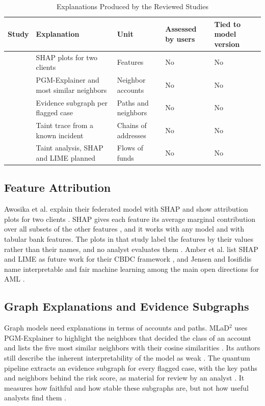 \documentclass[journal]{IEEEtran}
\begin{document}
\begin{table}[!t]
\centering
\caption{Explanations Produced by the Reviewed Studies}
\label{tab:xai}
\footnotesize
\begin{tabular}{@{}L{1.25cm}L{2.0cm}L{1.75cm}L{1.05cm}L{1.0cm}@{}}
\toprule
\textbf{Study} & \textbf{Explanation} & \textbf{Unit} & \textbf{Assessed by users} & \textbf{Tied to model version}\\
\midrule
\cite{awosika2024xai} & SHAP plots for two clients & Features & No & No\\
\cite{luo2024mlad} & PGM-Explainer and most similar neighbors & Neighbor accounts & No & No\\
\cite{nayak2026quantum} & Evidence subgraph per flagged case & Paths and neighbors & No & No\\
\cite{wu2024heists} & Taint trace from a known incident & Chains of addresses & No & No\\
\cite{amber2026cbdc} & Taint analysis, SHAP and LIME planned & Flows of funds & No & No\\
\bottomrule
\end{tabular}
\end{table}

\subsection{Feature Attribution}

Awosika et al. explain their federated model with SHAP \cite{lundberg2017shap} and show attribution plots for two clients \cite{awosika2024xai}. SHAP gives each feature its average marginal contribution over all subsets of the other features \cite{lundberg2017shap}, and it works with any model and with tabular bank features. The plots in that study label the features by their values rather than their names, and no analyst evaluates them \cite{awosika2024xai}. Amber et al. list SHAP and LIME as future work for their CBDC framework \cite{amber2026cbdc}, and Jensen and Iosifidis name interpretable and fair machine learning among the main open directions for AML \cite{jensen2023fighting}.

\subsection{Graph Explanations and Evidence Subgraphs}

Graph models need explanations in terms of accounts and paths. MLaD$^2$ uses PGM-Explainer to highlight the neighbors that decided the class of an account and lists the five most similar neighbors with their cosine similarities \cite{luo2024mlad}. Its authors still describe the inherent interpretability of the model as weak \cite{luo2024mlad}. The quantum pipeline extracts an evidence subgraph for every flagged case, with the key paths and neighbors behind the risk score, as material for review by an analyst \cite{nayak2026quantum}. It measures how faithful and how stable these subgraphs are, but not how useful analysts find them \cite{nayak2026quantum}.
\end{document}
